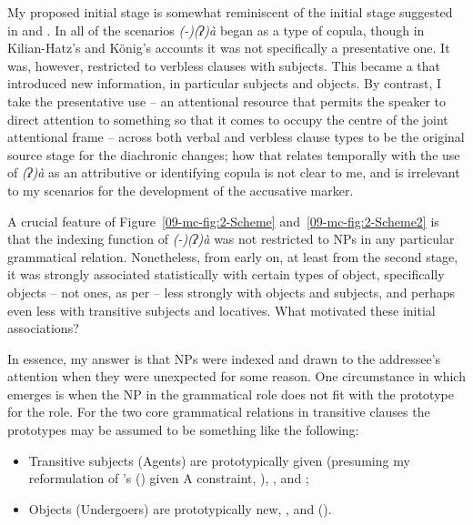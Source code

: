 \documentclass[output=paper]{LSP/langsci}
\begin{document}
My proposed initial stage is somewhat reminiscent of the initial stage suggested in \citet[376–378]{Kilian-Hatz2013Kxoe} and \citet[276–277]{Koenig2008Case}. In all of the scenarios \textit{(-)(ʔ)à}  began as a type of copula, though in Kilian-Hatz’s and König’s accounts it was not specifically a presentative one. It was, however, restricted to verbless clauses with  subjects. This became a  that introduced new information, in particular  subjects and  objects. By contrast, I take the presentative use – an attentional resource that permits the speaker to direct attention to something so that it comes to occupy the centre of the joint attentional frame \citep{Tomasello2003Constructing} – across both verbal and verbless clause types to be the original source stage for the diachronic changes; how that relates temporally with the use of \textit{(ʔ)à} as an attributive or identifying copula is not clear to me, and is irrelevant to my scenarios for the development of the accusative marker.

\newpage
A crucial feature of Figure~\ref{09-mc-fig:2-Scheme} and~\ref{09-mc-fig:2-Scheme2} is that the indexing function of \textit{(-)(ʔ)à} was not restricted to NPs in any particular grammatical relation. Nonetheless, from early on, at least from the second stage, it was strongly associated statistically with certain types of object, specifically  objects – not  ones, as per \citet[376–378]{Kilian-Hatz2013Kxoe} – less strongly with  objects and  subjects, and perhaps even less with transitive subjects and locatives. What motivated these initial associations?

In essence, my answer is that NPs were indexed and drawn to the addressee’s attention when they were unexpected for some reason. One circumstance in which  emerges is when the NP in the grammatical role does not fit with the prototype for the role. For the two core grammatical relations in transitive clauses the prototypes may be assumed to be something like the following:

\begin{itemize}
 \item Transitive subjects (Agents) are prototypically given (presuming my reformulation of \citeauthor{DuBois1987Discourse}’s (\citeyear{DuBois1987Discourse}) given A constraint, \citealt{McGregor1998Optional}), , and ;
\item Objects (Undergoers) are prototypically new, , and  (\eg \citealt{Comrie1979Definite}).
\end{itemize}
\end{document}
